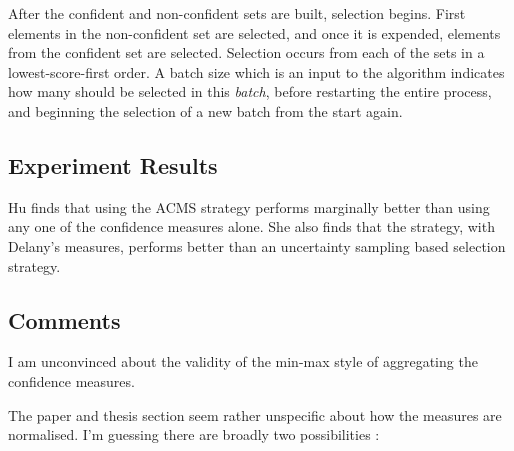 \documentclass[a4paper,11pt]{report}
\begin{document}
After the confident and non-confident sets are built, selection begins. First elements in the non-confident set are selected, and once it is expended, elements from the confident set are selected. Selection occurs from each of the sets in a lowest-score-first order. A batch size which is an input to the algorithm indicates how many should be selected in this \emph{batch}, before restarting the entire process, and beginning the selection of a new batch from the start again.

\subsection{Experiment Results}
Hu finds that using the ACMS strategy performs marginally better than using any one of the confidence measures alone. She also finds that the strategy, with Delany's measures, performs better than an uncertainty sampling based selection strategy.


\subsection{Comments\label{sec:hu2comments}}
I am unconvinced about the validity of the min-max style of aggregating the confidence measures.

The paper and thesis section seem rather unspecific about how the measures are normalised. I'm guessing there are broadly two possibilities :
\end{document}
